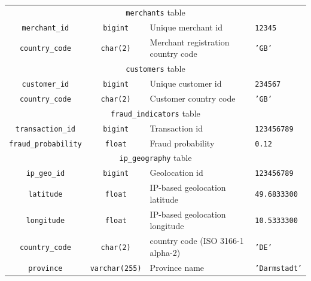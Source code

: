 \documentclass[11pt,a4paper,computermodern]{article}
\newcommand{\code}{\texttt}
\begin{document}
\begin{table}[ht]
\begin{threeparttable}
\begin{tabularx}{0.99\textwidth}{c c >{\centering\arraybackslash}X >{\centering\arraybackslash}X}
			\midrule
			\multicolumn{4}{c}{\code{merchants} table}\\
			\code{merchant\_id} & \code{bigint} & Unique merchant id & \code{12345} \\
			\code{country\_code} & \code{char(2)} & Merchant registration country code & \code{'GB'} \\
			
			\midrule
			\multicolumn{4}{c}{\code{customers} table}\\
			\code{customer\_id} & \code{bigint} & Unique customer id & \code{234567} \\
			\code{country\_code} & \code{char(2)} & Customer country code & \code{'GB'} \\
			
			\midrule
			\multicolumn{4}{c}{\code{fraud\_indicators} table}\\
			\code{transaction\_id} & \code{bigint} & Transaction id & \code{123456789} \\
			\code{fraud\_probability} & \code{float} & Fraud probability & \code{0.12} \\
			
			\midrule
			\multicolumn{4}{c}{\code{ip\_geography} table}\\
			\code{ip\_geo\_id} & \code{bigint} & Geolocation id & \code{123456789} \\
			\code{latitude} & \code{float} & IP-based geolocation latitude & \code{49.6833300} \\
			\code{longitude} & \code{float} & IP-based geolocation longitude & \code{10.5333300} \\
			\code{country\_code} & \code{char(2)} & country code (ISO 3166-1 alpha-2) & \code{'DE'} \\
			\code{province} & \code{varchar(255)} & Province name & \code{'Darmstadt'} \\
			
			\bottomrule
		\end{tabularx}
	\end{threeparttable}
\end{table}
\end{document}
